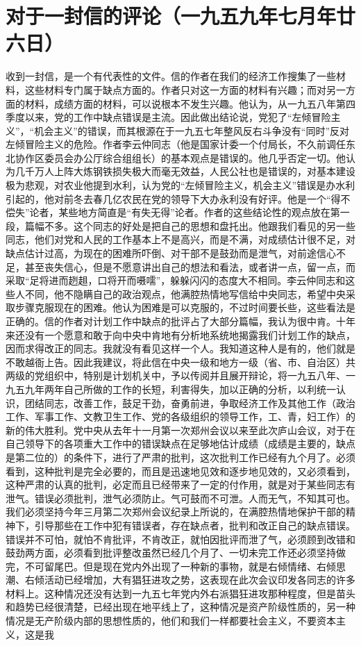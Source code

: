 \section[对于一封信的评论（一九五九年七月年廿六日）]{对于一封信的评论（一九五九年七月年廿六日）}


收到一封信，是一个有代表性的文件。信的作者在我们的经济工作搜集了一些材料，这些材料专门属于缺点方面的。作者只对这一方面的材料有兴趣；而对另一方面的材料，成绩方面的材料，可以说根本不发生兴趣。他认为，从一九五八年第四季度以来，党的工作中缺点错误是主流。因此做出结论说，党犯了“左倾冒险主义”，“机会主义”的错误，而其根源在于一九五七年整风反右斗争没有“同时”反对左倾冒险主义的危险。作者李云仲同志（他是国家计委一个付局长，不久前调任东北协作区委员会办公厅综合组组长）的基本观点是错误的。他几乎否定一切。他认为几千万人上阵大炼钢铁损失极大而毫无效益，人民公社也是错误的，对基本建设极为悲观，对农业他提到水利，认为党的“左倾冒险主义，机会主义”错误是办水利引起的，他对前冬去春几亿农民在党的领导下大办永利没有好评。他是一个“得不偿失”论者，某些地方简直是“有失无得”论者。作者的这些结论性的观点放在第一段，篇幅不多。这个同志的好处是把自己的思想和盘托出。他跟我们看见的另一些同志，他们对党和人民的工作基本上不是高兴，而是不满，对成绩估计很不足，对缺点估计过高，为现在的困难所吓倒、对干部不是鼓劲而是泄气，对前途信心不足，甚至丧失信心，但是不愿意讲出自己的想法和看法，或者讲一点，留一点，而采取“足将进而趔趄，口将开而嗫嚅”，躲躲闪闪的态度大不相同。李云仲同志和这些人不同，他不隐瞒自己的政治观点，他满腔热情地写信给中央同志，希望中央采取步骤克服现在的困难。他认为困难是可以克服的，不过时间要长些，这些看法是正确的。信的作者对计划工作中缺点的批评占了大部分篇幅，我认为很中肯。十年来还没有一个愿意和敢于向中央中肯地有分析地系统地揭露我们计划工作的缺点，因而求得改正的同志。我就没有看见这样一个人。我知道这种人是有的，他们就是不敢越衙上告。因此我建议，将此信在中央一级和地方一级（省、市、自治区）共两级的党组织中，特别是计划机关中，予以传阅并且展开辩论，将一九五八年、一九五九年两年自己所做的工作的长短，利害得失，加以正确的分析，以利统一认识，团结同志，改善工作，鼓足干劲，奋勇前进，争取经济工作及其他工作（政治工作、军事工作、文教卫生工作、党的各级组织的领导工作，工、青，妇工作）的新的伟大胜利。党中央从去年十一月第一次郑州会议以来至此次庐山会议，对于在自己领导下的各项重大工作中的错误缺点在足够地估计成绩（成绩是主要的，缺点是第二位的）的条件下，进行了严肃的批判，这次批判工作已经有九个月了。必须看到，这种批判是完全必要的，而且是迅速地见效和逐步地见效的，又必须看到，这种严肃的认真的批判，必定而且已经带来了一定的付作用，就是对于某些同志有泄气。错误必须批判，泄气必须防止。气可鼓而不可泄。人而无气，不知其可也。我们必须坚持今年三月第二次郑州会议纪录上所说的，在满腔热情地保护干部的精神下，引导那些在工作中犯有错误者，存在缺点者，批判和改正自己的缺点错误。错误并不可怕，就怕不肯批评，不肯改正，就怕因批评而泄了气，必须顾到改错和鼓劲两方面，必须看到批评整改虽然已经几个月了、一切未完工作还必须坚持做完，不可留尾巴。但是现在党内外出现了一种新的事物，就是右倾情绪、右倾思潮、右倾活动已经增加，大有猖狂进攻之势，这表现在此次会议印发各同志的许多材料上。这种情况还没有达到一九五七年党内外右派猖狂进攻那种程度，但是苗头和趋势已经很清楚，已经出现在地平线上了，这种情况是资产阶级性质的，另一种情况是无产阶级内部的思想性质的，他们和我们一样都要社会主义，不要资本主义，这是我